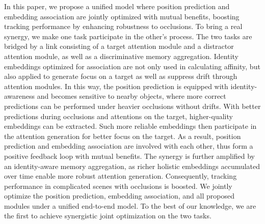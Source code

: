 \documentclass[final]{cvpr}
\begin{document}
In this paper, we propose a unified model where position prediction and embedding association are jointly optimized with mutual benefits, boosting tracking performance by enhancing robustness to occlusions. To bring a real synergy, we make one task participate in the other's process. The two tasks are bridged by a link consisting of a target attention module and a distractor attention module, as well as a discriminative memory aggregation. Identity embeddings optimized for association are not only used in calculating affinity, but also applied to generate focus on a target as well as suppress drift through attention modules. In this way, the position prediction is equipped with identity-awareness and becomes sensitive to nearby objects, where more correct predictions can be performed under heavier occlusions without drifts. With better predictions during occlusions and attentions on the target, higher-quality embeddings can be extracted. Such more reliable embeddings then participate in the attention generation for better focus on the target. As a result, position prediction and embedding association are involved with each other, thus form a positive feedback loop with mutual benefits. The synergy is further amplified by an identity-aware memory aggregation, as richer holistic embeddings accumulated over time enable more robust attention generation. Consequently, tracking performance in complicated scenes with occlusions is boosted. We jointly optimize the position prediction, embedding association, and all proposed modules under a unified end-to-end model.
To the best of our knowledge, we are the first to achieve synergistic joint optimization on the two tasks.

\end{document}

